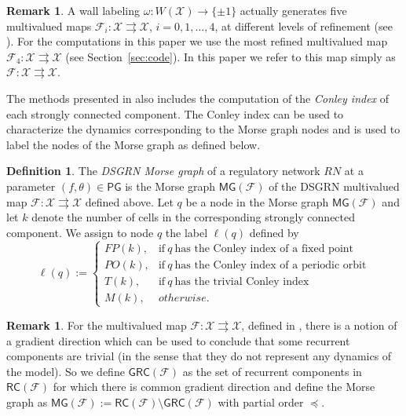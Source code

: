 \documentclass[12pt, notitlepage]{amsart}
\newcommand{\cF}{{\mathcal F}}
\newcommand{\cX}{{\mathcal X}}
\theoremstyle{definition}
\newtheorem{defn}[thm]{Definition}
\newtheorem{rem}[thm]{Remark}
\newcommand{\PG}{\mathsf{PG}}
\newcommand{\RC}{\mathsf{RC}}
\newcommand{\MG}{\mathsf{MG}}
\newcommand{\GRC}{\mathsf{GRC}}
\begin{document}
  \begin{rem}
    \label{DSGRN_STG}
    A wall labeling $\omega \colon W(\cX) \to \{ \pm 1\}$ actually generates five multivalued maps $\cF_i \colon \cX \rightrightarrows \cX$, $i = 0, 1, \ldots, 4$, at different levels of refinement (see \cite{rook_field:24}). For the computations in this paper we use the most refined multivalued map $\cF_4 \colon \cX \rightrightarrows \cX$ (see Section~\ref{sec:code}). In this paper we refer to this map simply as $\cF \colon \cX \rightrightarrows \cX$.
  \end{rem}

  The methods presented in \cite{rook_field:24} also includes the computation of the \emph{Conley index} of each strongly connected component. The Conley index can be used to characterize the dynamics corresponding to the Morse graph nodes and is used to label the nodes of the Morse graph as defined below.

  \begin{defn}
    \label{def:DSGRN_MG}
    The \emph{DSGRN Morse graph} of a regulatory network $RN$ at a parameter $(f, \theta) \in \PG$ is the Morse graph $\MG(\cF)$ of the DSGRN multivalued map $\cF \colon \cX \rightrightarrows \cX$ defined above. Let $q$ be a node in the Morse graph $\MG(\cF)$ and let $k$ denote the number of cells in the corresponding strongly connected component. We assign to node $q$ the label $\ell(q)$ defined by
    \[
      \ell(q) :=
      \begin{cases}
        FP(k), & \text{if}~ q ~\text{has the Conley index of a fixed point} \\
        PO(k), & \text{if}~ q ~\text{has the Conley index of a periodic orbit} \\
        T(k),  & \text{if}~ q ~\text{has the trivial Conley index} \\
        M(k),  & {otherwise}.
      \end{cases}
    \]
  \end{defn}

  \begin{rem}
    For the multivalued map $\cF \colon \cX \rightrightarrows \cX$, defined in \cite{rook_field:24}, there is a notion of a gradient direction which can be used to conclude that some recurrent components are trivial (in the sense that they do not represent any dynamics of the model). So we define $\GRC(\cF)$ as the set of recurrent components in $\RC(\cF)$ for which there is common gradient direction and define the Morse graph as $\MG(\cF) := \RC(\cF) \setminus \GRC(\cF)$ with partial order $\preceq$.
  \end{rem}
\end{document}
